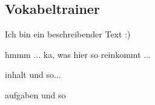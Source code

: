 \subsection{Vokabeltrainer}

\begin{textbereich}
Ich bin ein beschreibender Text :)
\end{textbereich}
\begin{statistikbereich}
hmmm ... ka, was hier so reinkommt ...
\end{statistikbereich}

\begin{navigation}
\end{navigation}
\begin{inhaltsbereich}
inhalt und so...
\end{inhaltsbereich}

\begin{navigation}
\end{navigation}
\begin{aufgabenbereich}
aufgaben und so
\end{aufgabenbereich}


